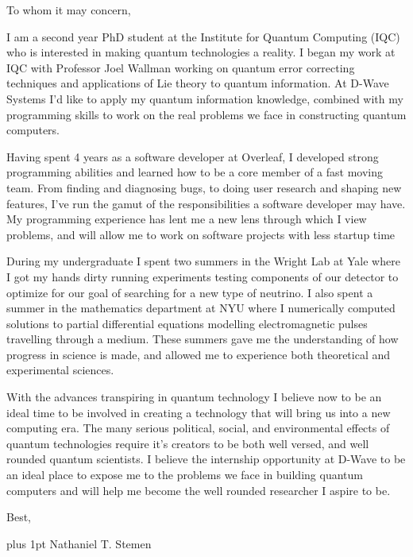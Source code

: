 \documentclass[12pt]{article}
\begin{document}
\noindent
To whom it may concern,

I am a second year PhD student at the Institute for Quantum Computing (IQC) who is interested in making quantum technologies a reality.
I began my work at IQC with Professor Joel Wallman working on quantum error correcting techniques and applications of Lie theory to quantum information.
At D-Wave Systems I'd like to apply my quantum information knowledge, combined with my programming skills to work on the real problems we face in constructing quantum computers.

Having spent 4 years as a software developer at Overleaf, I developed strong programming abilities and learned how to be a core member of a fast moving team.
From finding and diagnosing bugs, to doing user research and shaping new features, I've run the gamut of the responsibilities a software developer may have.
My programming experience has lent me a new lens through which I view problems, and will allow me to work on software projects with less startup time

During my undergraduate I spent two summers in the Wright Lab at Yale where I got my hands dirty running experiments testing components of our detector to optimize for our goal of searching for a new type of neutrino.
I also spent a summer in the mathematics department at NYU where I numerically computed solutions to partial differential equations modelling electromagnetic pulses travelling through a medium.
These summers gave me the understanding of how progress in science is made, and allowed me to experience both theoretical and experimental sciences.

With the advances transpiring in quantum technology I believe now to be an ideal time to be involved in creating a technology that will bring us into a new computing era.
The many serious political, social, and environmental effects of quantum technologies require it's creators to be both well versed, and well rounded quantum scientists.
I believe the internship opportunity at D-Wave to be an ideal place to expose me to the problems we face in building quantum computers and will help me become the well rounded researcher I aspire to be.

\noindent
Best,

\parskip=0pt plus 1pt
Nathaniel T. Stemen
\end{document}
